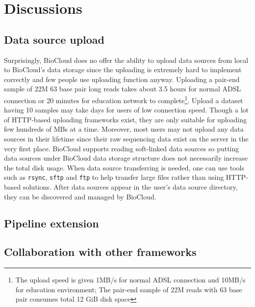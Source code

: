 \chapter{Discussions}
\label{c:discussion}


\section{Data source upload}

Surprisingly, BioCloud does no offer the ability to upload data sources from
local to BioCloud's data storage since the uploading is extremely hard to
implement correctly and few people use uploading function anyway. Uploading a
pair-end sample of 22M 63 base pair long reads takes about 3.5 hours for normal
ADSL connection or 20 minutes for education network to complete\footnote{The
upload speed is given 1MB/s for normal ADSL connection and 10MB/s for education
environment; The pair-end sample of 22M reads with 63 base pair consumes total
12 GiB disk space}. Upload a dataset having 10 samples may take days for users
of low connection speed. Though a lot of HTTP-based uploading frameworks exist,
they are only suitable for uploading few hundreds of MBs at a time. Moreover,
most users may not upload any data sources in their lifetime since their raw
sequencing data exist on the server in the very first place. BioCloud supports
reading soft-linked data sources so putting data sources under BioCloud data
storage structure does not necessarily increase the total disk usage. When data
source transferring is needed, one can use tools such as \texttt{rsync},
\texttt{sftp} and \texttt{ftp} to help transfer large files rather than using
HTTP-based solutions. After data sources appear in the user's data source
directory, they can be discovered and managed by BioCloud.



\section{Pipeline extension}

%
%


\section{Collaboration with other frameworks}

